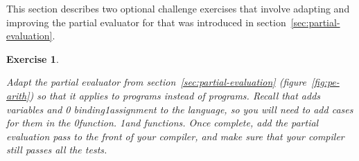 \documentclass[7x10]{TimesAPriori_MIT}%
\def\racketEd{0}
\def\pythonEd{1}
\def\edition{1}
\newcommand{\racket}[1]{{\if\edition\racketEd{#1}\fi}}
\newcommand{\pythonColor}[0]{}
\newcommand{\python}[1]{{\if\edition\pythonEd\pythonColor #1\fi}}
\newtheorem{exercise}[theorem]{Exercise}
\numberwithin{theorem}{chapter}
\numberwithin{definition}{chapter}
\numberwithin{equation}{chapter}
\begin{document}
This section describes two optional challenge exercises that involve
adapting and improving the partial evaluator for \LangInt{} that was
introduced in section~\ref{sec:partial-evaluation}.

\begin{exercise}\label{ex:pe-Lvar}
\normalfont\normalsize
  
Adapt the partial evaluator from section~\ref{sec:partial-evaluation}
(figure~\ref{fig:pe-arith}) so that it applies to \LangVar{} programs
instead of \LangInt{} programs. Recall that \LangVar{} adds variables and
%
\racket{ binding}\python{assignment}
%
to the \LangInt{} language, so you will need to add cases for them in
the 
%
\racket{function.}
%
\python{and  functions.}
%
Once complete, add the partial evaluation pass to the front of your
compiler, and make sure that your compiler still passes all the
tests.
\end{exercise}
\end{document}
